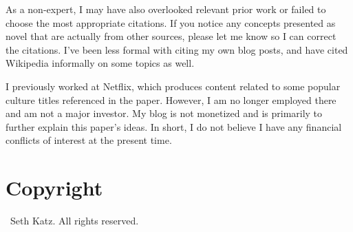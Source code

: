 \documentclass{article}
\begin{document}
As a non-expert, I may have also overlooked relevant prior work or failed to choose the most appropriate citations. If you notice any concepts presented as novel that are actually from other sources, please let me know so I can correct the citations. I've been less formal with citing my own blog posts, and have cited Wikipedia informally on some topics as well.

I previously worked at Netflix, which produces content related to some popular culture titles referenced in the paper.   However, I am no longer employed there and am not a major investor. My blog is not monetized and is primarily to further explain this paper's ideas.   In short, I do not believe I have any financial conflicts of interest at the present time.

\section{Copyright}
\small
\textcopyright\ Seth Katz. All rights reserved.

 
\printbibliography 
\end{document}
